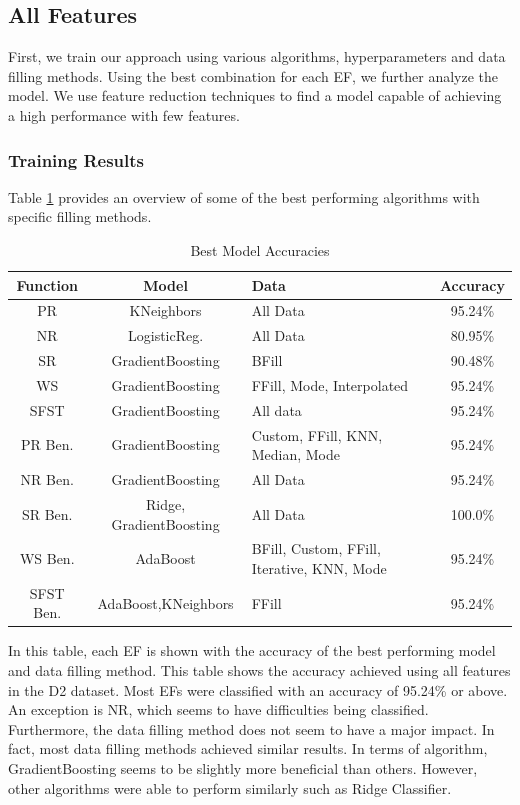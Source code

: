 \documentclass[12pt,letterpaper]{article}
\begin{document}
\subsection{All Features}\label{sec:class_all}
First, we train our approach using various algorithms, hyperparameters and data filling methods.
Using the best combination for each \ac{EF}, we further analyze the model.
We use feature reduction techniques to find a model capable of achieving a high performance with few features.

\subsubsection{Training Results}\label{sec:class_all_results}
Table \ref{tab_class_all:model_accuracies_best} provides an overview of some of the best performing algorithms with specific filling methods.


\begin{table}[H]
\centering
\begin{tabular}{|c|c|p{4cm}|c|}
\hline
\textbf{Function} & \textbf{Model} & \textbf{Data} & \textbf{Accuracy} \\
\hline
PR & KNeighbors & All Data & 95.24\% \\
\hline
NR    & LogisticReg. & All Data & 80.95\% \\
\hline
SR    & GradientBoosting & BFill & 90.48\% \\
\hline
WS    & GradientBoosting & FFill, Mode, Interpolated & 95.24\% \\
\hline
SFST  & GradientBoosting & All data & 95.24\% \\
\hline
PR Ben. & GradientBoosting & Custom, FFill, KNN, Median, Mode & 95.24\% \\
\hline
NR Ben. & GradientBoosting & All Data & 95.24\% \\
\hline
SR Ben.& Ridge, GradientBoosting & All Data & 100.0\% \\
\hline
WS Ben. & AdaBoost & BFill, Custom, FFill, Iterative, KNN, Mode & 95.24\% \\
\hline
SFST Ben. & AdaBoost,KNeighbors & FFill & 95.24\% \\
\hline
\end{tabular}
\caption{Best Model Accuracies}
\label{tab_class_all:model_accuracies_best}
\end{table}

In this table, each \ac{EF} is shown with the accuracy of the best performing model and data filling method.
This table shows the accuracy achieved using all features in the D2 dataset.
Most \ac{EF}s were classified with an accuracy of 95.24\% or above.
An exception is \ac{NR}, which seems to have difficulties being classified.
Furthermore, the data filling method does not seem to have a major impact.
In fact, most data filling methods achieved similar results.
In terms of algorithm, GradientBoosting seems to be slightly more beneficial than others.
However, other algorithms were able to perform similarly such as Ridge Classifier.
\end{document}
